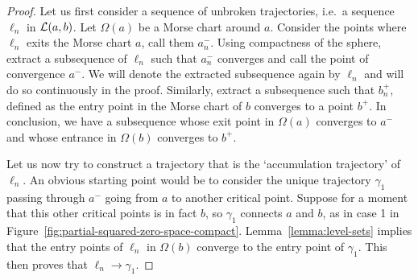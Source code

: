 \begin{proof}
    Let us first consider a sequence of unbroken trajectories, i.e.\ a sequence $\ell_n$ in $\mathcal L(a, b)$.
    Let $\Omega(a)$ be a Morse chart around $a$.
    Consider the points where $\ell_n$ exits the Morse chart $a$, call them $a_n^{-}$.
    Using compactness of the sphere, extract a subsequence of $\ell_n$ such that $a_{n}^{-}$ converges and call the point of convergence $a^{-}$.
    We will denote the extracted subsequence again by $\ell_n$ and will do so continuously in the proof.
    Similarly, extract a subsequence such that $b_n^{+}$, defined as the entry point in the Morse chart of $b$ converges to a point $b^{+}$.
    In conclusion, we have a subsequence whose exit point in $\Omega(a)$  converges to $a^{-}$ and whose entrance in $\Omega(b)$ converges to  $b^{+}$.

    Let us now try to construct a trajectory that is the `accumulation trajectory' of $\ell_n$.
    An obvious starting point would be to consider the unique trajectory $\gamma_1$ passing through $a^{-}$ going from $a$ to another critical point.
    Suppose for a moment that this other critical points is in fact $b$, so $\gamma_1$ connects  $a$ and  $b$, as in case 1 in Figure~\ref{fig:partial-squared-zero-space-compact}.
    Lemma~\ref{lemma:level-sets} implies that the entry points of $\ell_n$ in $\Omega(b)$ converge to the entry point of $\gamma_1$. This then proves that $\ell_n \to  \gamma_1$.


\end{proof}
